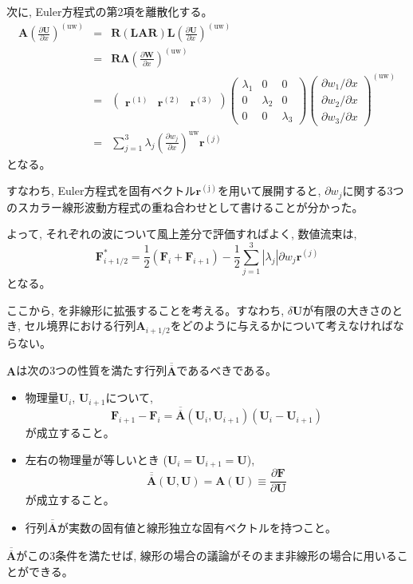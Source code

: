 \documentclass[dvipdfmx,b5paper]{jsarticle}
\newcommand{\oover}[1]{\overline{\overline{#1}}}
\begin{document}
次に, Euler方程式の第2項を離散化する。
\begin{eqnarray}
  \bm{A}\left(\frac{\partial \bm{U}}{\partial x}\right)^{\mathrm{(uw)}} &=& \bm{R}(\bm{LAR})\bm{L}\left(\frac{\partial \bm{U}}{\partial x}\right)^{\mathrm{(uw)}} \\
  &=& \bm{R\Lambda}\left(\frac{\partial \bm{W}}{\partial x}\right)^{\mathrm{(uw)}} \\
  &=& \begin{pmatrix}
    \bm{r}^{(1)} & \bm{r}^{(2)} & \bm{r}^{(3)}
  \end{pmatrix}
  \begin{pmatrix}
    \lambda_1 & 0 & 0 \\
    0 & \lambda_2 & 0 \\
    0 & 0 & \lambda_3
  \end{pmatrix}
  \begin{pmatrix}
    \partial w_1/\partial x \\
    \partial w_2/\partial x \\
    \partial w_3/\partial x 
  \end{pmatrix}^{\mathrm{(uw)}} \\
  &=& \sum_{j=1}^{3}\lambda_j\left(\frac{\partial w_j}{\partial x}\right)^{\mathrm{uw}}\bm{r}^{(j)}
\end{eqnarray}
となる。

すなわち, Euler方程式を固有ベクトル$\bm{r}^{\mathrm{(j)}}$を用いて展開すると, $\partial w_j$に関する3つのスカラー線形波動方程式の重ね合わせとして書けることが分かった。

よって, それぞれの波について風上差分で評価すればよく, 数値流束は, 
\begin{equation}
  \bm{F}_{i+1/2}^{*}=\frac{1}{2}\left(\bm{F}_{i}+\bm{F}_{i+1}\right)-\frac{1}{2}\sum_{j=1}^{3}|\lambda_j|\partial w_j\bm{r}^{(j)}
  \label{flux_liner}
\end{equation}
となる。

ここから, を非線形に拡張することを考える。すなわち, $\delta\bm{U}$が有限の大きさのとき, セル境界における行列$\bm{A}_{i+1/2}$をどのように与えるかについて考えなければならない。

$\bm{A}$は次の3つの性質を満たす行列$\oover{\bm{A}}$であるべきである。
\begin{itemize}
  \item 物理量$\bm{U}_{i}$, $\bm{U}_{i+1}$について, 
  \begin{equation}
    \bm{F}_{i+1}-\bm{F}_{i} = \oover{\bm{A}}(\bm{U}_{i}, \bm{U}_{i+1})(\bm{U}_{i}-\bm{U}_{i+1})
  \end{equation}
  が成立すること。
  \item 左右の物理量が等しいとき ($\bm{U}_{i}=\bm{U}_{i+1}=\bm{U}$), 
  \begin{equation}
    \oover{\bm{A}}(\bm{U}, \bm{U})=\bm{A}(\bm{U})\equiv\frac{\partial \bm{F}}{\partial \bm{U}}
  \end{equation}
  が成立すること。
  \item 行列$\oover{\bm{A}}$が実数の固有値と線形独立な固有ベクトルを持つこと。
\end{itemize}
$\oover{\bm{A}}$がこの3条件を満たせば, 線形の場合の議論がそのまま非線形の場合に用いることができる。
\end{document}

